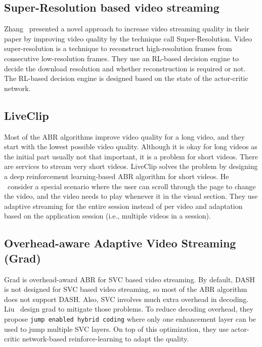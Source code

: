 \subsection{Super-Resolution based video streaming}
Zhang \etal\ presented a novel approach to increase video streaming quality in their paper \cite{9155384} by improving video quality by the technique call Super-Resolution. Video super-resolution is a technique to reconstruct high-resolution frames from consecutive low-resolution frames. They use an RL-based decision engine to decide the download resolution and whether reconstruction is required or not. The RL-based decision engine is designed based on the state of the actor-critic network.

\subsection{LiveClip}
Most of the ABR algorithms improve video quality for a long video, and they start with the lowest possible video quality. Although it is okay for long videos as the initial part usually not that important, it is a problem for short videos. There are services to stream very short videos. LiveClip\cite{10.1145/3386290.3396937} solves the problem by designing a deep reinforcement learning-based ABR algorithm for short videos. He \etal\ consider a special scenario where the user can scroll through the page to change the video, and the video needs to play whenever it in the visual section. They use adaptive streaming for the entire session instead of per video and adaptation based on the application session (i.e., multiple videos in a session).

\subsection{Overhead-aware Adaptive Video Streaming (Grad)}
Grad\cite{10.1145/3394171.3413512} is overhead-award ABR for SVC based video streaming. By default, DASH is not designed for SVC based video streaming, so most of the ABR algorithm does not support DASH. Also, SVC involves much extra overhead in decoding. Liu \etal\ design grad to mitigate those problems. To reduce decoding overhead, they propose {\tt jump enabled hybrid coding} where only one enhancement layer can be used to jump multiple SVC layers. On top of this optimization, they use actor-critic network-based reinforce-learning to adapt the quality.

